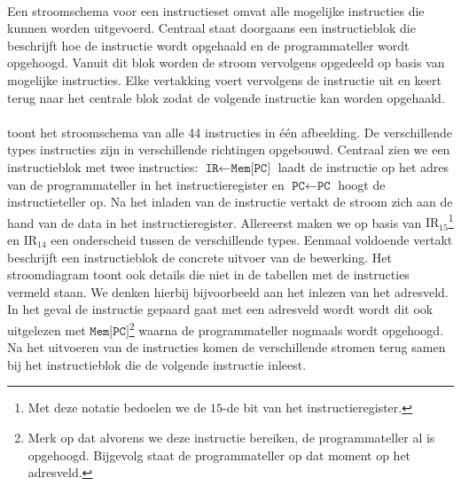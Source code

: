 \paragraph{}
Een stroomschema voor een instructieset omvat alle mogelijke instructies die kunnen worden uitgevoerd. Centraal staat doorgaans een instructieblok die beschrijft hoe de instructie wordt opgehaald en de programmateller wordt opgehoogd. Vanuit dit blok worden de stroom vervolgens opgedeeld op basis van mogelijke instructies. Elke vertakking voert vervolgens de instructie uit en keert terug naar het centrale blok zodat de volgende instructie kan worden opgehaald.
\paragraph{}
 toont het stroomschema van alle 44 instructies in \'e\'en afbeelding. De verschillende types instructies zijn in verschillende richtingen opgebouwd. Centraal zien we een instructieblok met twee instructies: $\texttt{IR}\leftarrow\texttt{Mem[PC]}$ laadt de instructie op het adres van de programmateller in het instructieregister en $\texttt{PC}\leftarrow\texttt{PC}$ hoogt de instructieteller op. Na het inladen van de instructie vertakt de stroom zich aan de hand van de data in het instructieregister. Allereerst maken we op basis van $\mbox{IR}_{15}$\footnote{Met deze notatie bedoelen we de $15$-de bit van het instructieregister.} en $\mbox{IR}_{14}$ een onderscheid tussen de verschillende types. Eenmaal voldoende vertakt beschrijft een instructieblok de concrete uitvoer van de bewerking. Het stroomdiagram toont ook details die niet in de tabellen met de instructies vermeld staan. We denken hierbij bijvoorbeeld aan het inlezen van het adresveld. In het geval de instructie gepaard gaat met een adresveld wordt wordt dit ook uitgelezen met $\texttt{Mem[PC]}$\footnote{Merk op dat alvorens we deze instructie bereiken, de programmateller al is opgehoogd. Bijgevolg staat de programmateller op dat moment op het adresveld.} waarna de programmateller nogmaals wordt opgehoogd. Na het uitvoeren van de instructies komen de verschillende stromen terug samen bij het instructieblok die de volgende instructie inleest.
